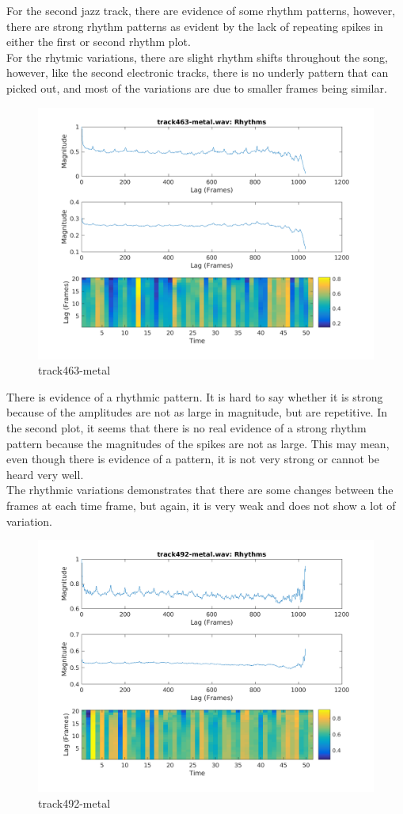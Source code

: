\documentclass[11pt, a4paper]{article}
\begin{document}
For the second jazz track, there are evidence of some rhythm patterns, however, there are strong rhythm patterns as evident by the lack of repeating spikes in either the first or second rhythm plot. \\

For the rhytmic variations, there are slight rhythm shifts throughout the song, however, like the second electronic tracks, there is no underly pattern that can picked out, and most of the variations are due to smaller frames being similar. 


\begin{figure}[H]
    \centering
    \includegraphics[width=.8\textwidth]{track463-metal-Rhythm.png}
    \caption{track463-metal}
\end{figure} 

There is evidence of a rhythmic pattern. It is hard to say whether it is strong because of the amplitudes are not as large in magnitude, but are repetitive. In the second plot, it seems that there is no real evidence of a strong rhythm pattern because the magnitudes of the spikes are not as large. This may mean, even though there is evidence of a pattern, it is not very strong or cannot be heard very well. \\

The rhythmic variations demonstrates that there are some changes between the frames at each time frame, but again, it is very weak and does not show a lot of variation. 

\begin{figure}[H]
    \centering
    \includegraphics[width=.8\textwidth]{track492-metal-Rhythm.png}
    \caption{track492-metal}
\end{figure}
\end{document}
